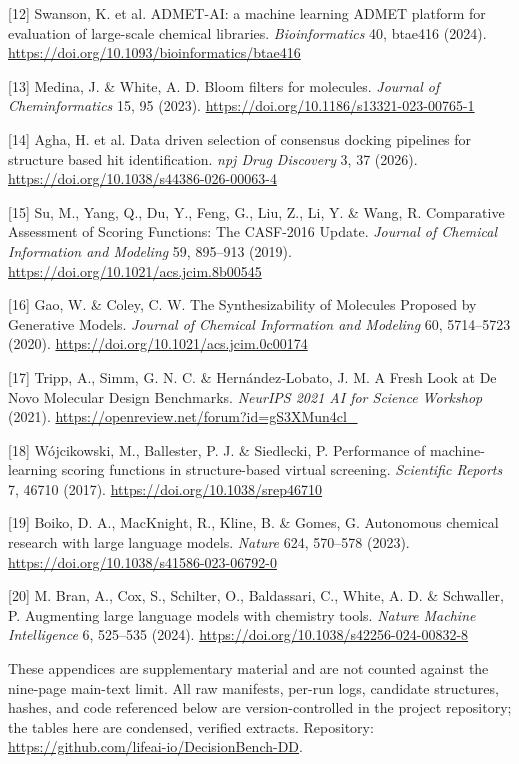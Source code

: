 \documentclass{article}
\begin{document}
[12] Swanson, K. et al. ADMET-AI: a machine learning ADMET platform for evaluation of large-scale chemical libraries. \textit{Bioinformatics} 40, btae416 (2024). \url{https://doi.org/10.1093/bioinformatics/btae416}

[13] Medina, J. \& White, A. D. Bloom filters for molecules. \textit{Journal of Cheminformatics} 15, 95 (2023). \url{https://doi.org/10.1186/s13321-023-00765-1}

[14] Agha, H. et al. Data driven selection of consensus docking pipelines for structure based hit identification. \textit{npj Drug Discovery} 3, 37 (2026). \url{https://doi.org/10.1038/s44386-026-00063-4}

[15] Su, M., Yang, Q., Du, Y., Feng, G., Liu, Z., Li, Y. \& Wang, R. Comparative Assessment of Scoring Functions: The CASF-2016 Update. \textit{Journal of Chemical Information and Modeling} 59, 895--913 (2019). \url{https://doi.org/10.1021/acs.jcim.8b00545}

[16] Gao, W. \& Coley, C. W. The Synthesizability of Molecules Proposed by Generative Models. \textit{Journal of Chemical Information and Modeling} 60, 5714--5723 (2020). \url{https://doi.org/10.1021/acs.jcim.0c00174}

[17] Tripp, A., Simm, G. N. C. \& Hern\'{a}ndez-Lobato, J. M. A Fresh Look at De Novo Molecular Design Benchmarks. \textit{NeurIPS 2021 AI for Science Workshop} (2021). \url{https://openreview.net/forum?id=gS3XMun4cl_}

[18] W\'{o}jcikowski, M., Ballester, P. J. \& Siedlecki, P. Performance of machine-learning scoring functions in structure-based virtual screening. \textit{Scientific Reports} 7, 46710 (2017). \url{https://doi.org/10.1038/srep46710}

[19] Boiko, D. A., MacKnight, R., Kline, B. \& Gomes, G. Autonomous chemical research with large language models. \textit{Nature} 624, 570--578 (2023). \url{https://doi.org/10.1038/s41586-023-06792-0}

[20] M. Bran, A., Cox, S., Schilter, O., Baldassari, C., White, A. D. \& Schwaller, P. Augmenting large language models with chemistry tools. \textit{Nature Machine Intelligence} 6, 525--535 (2024). \url{https://doi.org/10.1038/s42256-024-00832-8}

\clearpage
\appendix

These appendices are supplementary material and are not counted against the nine-page main-text limit. All raw manifests, per-run logs, candidate structures, hashes, and code referenced below are version-controlled in the project repository; the tables here are condensed, verified extracts. Repository: \url{https://github.com/lifeai-io/DecisionBench-DD}.
\end{document}
